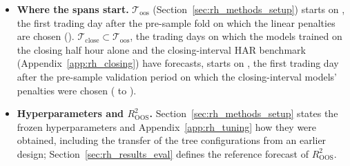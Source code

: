 \begin{itemize}
\item \textbf{Where the spans start.} $\mathcal T_{\mathrm{oos}}$ (Section~\ref{sec:rh_methods_setup}) starts on
  \rhorSpanStart, the first trading day after the pre-sample fold on which the linear penalties are chosen
  (\rhorPenSample). $\mathcal T_{\mathrm{close}} \subset \mathcal T_{\mathrm{oos}}$, the \rhoosDays{} trading days on
  which the models trained on the closing half hour alone and the closing-interval HAR benchmark
  (Appendix~\ref{app:rh_closing}) have forecasts, starts on \rhoosSpanStart, the first trading day after the
  pre-sample validation period on which the closing-interval models' penalties were chosen (\cmPtValFirst{} to
  \cmPtValLast).
\item \textbf{Hyperparameters and $R^2_{\mathrm{OOS}}$.} Section~\ref{sec:rh_methods_setup} states the frozen
  hyperparameters and Appendix~\ref{app:rh_tuning} how they were obtained, including the transfer of the tree
  configurations from an earlier design; Section~\ref{sec:rh_results_eval} defines the reference forecast of
  $R^2_{\mathrm{OOS}}$.

\end{itemize}
